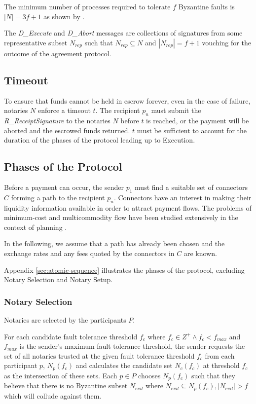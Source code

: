\documentclass[letterpaper,twocolumn,10pt]{article}
\begin{document}
The minimum number of processes required to tolerate $f$ Byzantine faults is $\left\vert{N}\right\vert = 3f + 1$ as shown by \cite{bracha1985asynchronous}.

The \textit{D\_Execute} and \textit{D\_Abort} messages are collections of signatures from some representative subset $N_{rep}$ such that $N_{rep} \subseteq N$ and $|N_{rep}| = f+1$ vouching for the outcome of the agreement protocol.


\subsection{Timeout}
\label{subsec:timeout}

To ensure that funds cannot be held in escrow forever, even in the case of failure, notaries $N$ enforce a timeout $t$. The recipient $p_n$ must submit the \textit{R\_ReceiptSignature} to the notaries $N$ before $t$ is reached, or the payment will be aborted and the escrowed funds returned. $t$ must be sufficient to account for the duration of the phases of the protocol leading up to Execution.


\subsection{Phases of the Protocol}

Before a payment can occur, the sender $p_1$ must find a suitable set of connectors $C$ forming a path to the recipient $p_n$. Connectors have an interest in making their liquidity information available in order to attract payment flows. The problems of minimum-cost and multicommodity flow have been studied extensively in the context of planning \cite{ahuja1988network,cai2001time,wagner1959class}.

In the following, we assume that a path has already been chosen and the exchange rates and any fees quoted by the connectors in $C$ are known.

Appendix \ref{sec:atomic-sequence} illustrates the phases of the protocol, excluding Notary Selection and Notary Setup.


\subsubsection{Notary Selection}
\label{subsec:notary-selection}

Notaries are selected by the participants $P$.

For each candidate fault tolerance threshold $f_c$ where $f_c \in Z^+ \land f_c < f_{max}$ and $f_{max}$ is the sender's maximum fault tolerance threshold, the sender requests the set of all notaries trusted at the given fault tolerance threshold $f_c$ from each participant $p$, $N_p(f_c)$ and calculates the candidate set $N_c(f_c)$ at threshold $f_c$ as the intersection of these sets. Each $p \in P$ chooses $N_p(f_c)$ such that they believe that there is no Byzantine subset $N_{evil}$ where $N_{evil} \subseteq N_p(f_c), |N_{evil}| > f$ which will collude against them.
\end{document}
